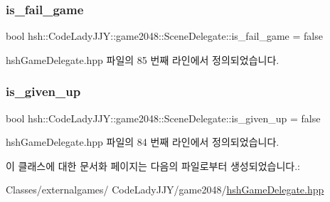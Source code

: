 \subsubsection{\texorpdfstring{is\+\_\+fail\+\_\+game}{is\_fail\_game}}
{\footnotesize\ttfamily bool hsh\+::\+Code\+Lady\+J\+J\+Y\+::game2048\+::\+Scene\+Delegate\+::is\+\_\+fail\+\_\+game = false\hspace{0.3cm}{\ttfamily [protected]}}



hsh\+Game\+Delegate.\+hpp 파일의 85 번째 라인에서 정의되었습니다.

\mbox{\label{classhsh_1_1_code_lady_j_j_y_1_1game2048_1_1_scene_delegate_a8ea6710e5c00d1af16c4566260c62501}} 
\subsubsection{\texorpdfstring{is\+\_\+given\+\_\+up}{is\_given\_up}}
{\footnotesize\ttfamily bool hsh\+::\+Code\+Lady\+J\+J\+Y\+::game2048\+::\+Scene\+Delegate\+::is\+\_\+given\+\_\+up = false\hspace{0.3cm}{\ttfamily [protected]}}



hsh\+Game\+Delegate.\+hpp 파일의 84 번째 라인에서 정의되었습니다.



이 클래스에 대한 문서화 페이지는 다음의 파일로부터 생성되었습니다.\+:\begin{DoxyCompactItemize}
\item 
Classes/externalgames/ Code\+Lady\+J\+J\+Y/game2048/\hyperlink{hsh_game_delegate_8hpp}{hsh\+Game\+Delegate.\+hpp}\end{DoxyCompactItemize}
